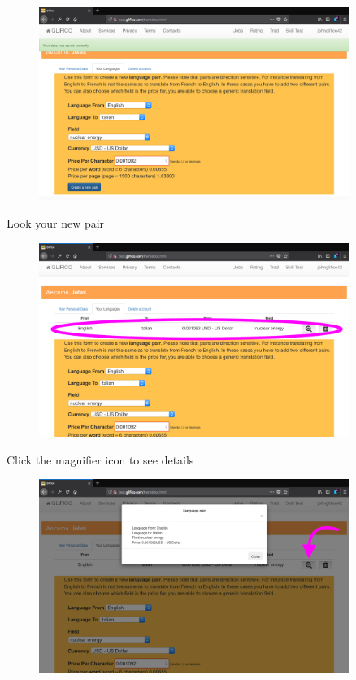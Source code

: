 \documentclass[11 pt, a4paper]{article}
\begin{document}
\begin{figure}[H]
\centering
\includegraphics[width=0.9\textwidth]{translator_pair5.png}
\end{figure}


\clearpage
Look your new pair
\begin{figure}[H]
\centering
\includegraphics[width=0.9\textwidth]{translator_pair6.png}
\end{figure}

Click the magnifier icon to see details
\begin{figure}[H]
\centering
\includegraphics[width=0.9\textwidth]{translator_pair7.png}
\end{figure}
\end{document}
